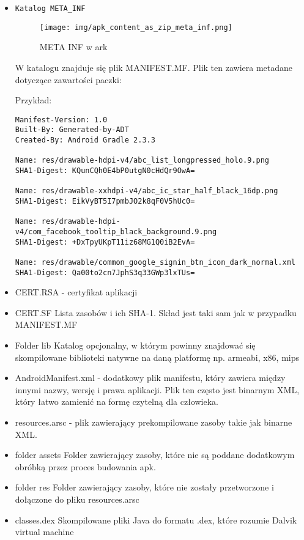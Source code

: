 \documentclass[12pt,a4paper,leqno,oneside,titlepage]{book}
\begin{document}
\begin{itemize}
\item \texttt{Katalog META\_INF}

\begin{figure}[H]
	\centering
	\texttt{[image: img/apk\_content\_as\_zip\_meta\_inf.png]}
	\caption{META INF w ark}
\end{figure}

W katalogu znajduje się plik MANIFEST.MF. Plik ten zawiera metadane dotyczące zawartości paczki:

Przykład:

\begin{lstlisting}
Manifest-Version: 1.0
Built-By: Generated-by-ADT
Created-By: Android Gradle 2.3.3

Name: res/drawable-hdpi-v4/abc_list_longpressed_holo.9.png
SHA1-Digest: KQunCQh0E4bP0utgN0cHdQr9OwA=

Name: res/drawable-xxhdpi-v4/abc_ic_star_half_black_16dp.png
SHA1-Digest: EikVyBT5I7pmbJO2k8qF0V5hUc0=

Name: res/drawable-hdpi-v4/com_facebook_tooltip_black_background.9.png
SHA1-Digest: +DxTpyUKpT11iz68MG1Q0iB2EvA=

Name: res/drawable/common_google_signin_btn_icon_dark_normal.xml
SHA1-Digest: Qa00to2cn7JphS3q33GWp3lxTUs=
\end{lstlisting}

\item CERT.RSA - certyfikat aplikacji
\item CERT.SF
Lista zasobów i ich SHA-1. Skład jest taki sam jak w przypadku MANIFEST.MF


\item Folder lib
Katalog opcjonalny, w którym powinny znajdować się skompilowane biblioteki natywne na daną platformę np. armeabi, x86, mips

\item AndroidManifest.xml - dodatkowy plik manifestu, który zawiera między innymi nazwy, wersję i prawa aplikacji. Plik ten często jest binarnym XML, który łatwo zamienić na formę czytelną dla człowieka.

\item resources.arsc - plik zawierający prekompilowane zasoby takie jak binarne XML.

\item folder assets
Folder zawierający zasoby, które nie są poddane dodatkowym obróbką przez proces budowania apk.

\item folder res
Folder zawierający zasoby, które nie zostały przetworzone i dołączone do pliku resources.arsc

\item classes.dex Skompilowane pliki Java do formatu .dex, które rozumie Dalvik virtual machine

\end{itemize}
\end{document}
